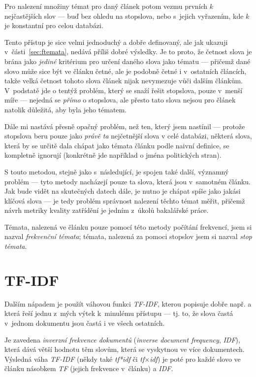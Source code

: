 \documentclass[12pt,a4paper]{report}
\begin{document}
Pro nalezení množiny témat pro daný článek potom vezmu prvních $k$ nej\-ča\-s\-tě\-j\-ších slov --- buď bez ohledu na stopslova, nebo s~jejich vyřazením, kde $k$ je konstantní pro celou databázi.

Tento přístup je sice velmi jednoduchý a dobře definovaný, ale jak ukazuji v~části~\ref{sec:ftemata}, nedává příliš dobré výsledky. Je to proto, že četnost slova je brána jako \emph{jediné} kritérium pro určení daného slova jako tématu --- přičemž dané slovo může sice být ve článku četné, ale je podobně četné i v~ostatních článcích, takže velká četnost tohoto slova článek nijak nevymezuje vůči dalším článkům. V~podstatě jde o tentýž problém, který se snaží řešit stopslova, pouze v~menší míře --- nejedná se \emph{přímo} o stopslova, ale přesto tato slova nejsou pro článek natolik důležitá, aby byla jeho tématem.

Dále mi nastává přesně opačný problém, než ten, který jsem nastínil --- protože stopslova beru pouze jako \emph{právě ta} nejčetnější slova v celé databázi, některá slova, která by se určitě dala chápat jako témata článku podle naivní definice, se kompletně ignorují (konkrétně jde například o jména politických stran).

S touto metodou, stejně jako s~následující, je spojen také další, významný problém --- tyto metody nacházejí pouze ta slova, která jsou v~samotném článku. Jak bude vidět na skutečných datech dále, je nutno je chápat spíše jako jakási klíčová slova --- je tedy problém správnost nalezení těchto témat měřit, přičemž návrh metriky kvality zatřídění je jedním z~úkolů bakalářské práce.

Témata, nalezená ve článku pouze pomocí této metody počítání frekvencí, jsem si nazval \emph{frekvenční témata}; témata, nalezená za pomoci stopslov jsem si nazval \emph{stop témata}.

\section{TF-IDF}
\label{sec:tfidf_teory}
Dalším nápadem je použít váhovou funkci \emph{TF-IDF}, kterou popisuje dobře např. \cite{approaches} a která řeší jednu z~mých výtek k~minulému přístupu --- tj. to, že slova častá v~jednom dokumentu jsou častá i ve všech ostatních.

Je zavedena \emph{inverzní frekvence dokumentů} (\emph{inverse document frequency}, \emph{IDF}), která dává větší hodnotu těm slovům, která se vyskytnou ve více dokumentech. Výsledná váha \emph{TF-IDF} (někdy také \emph{tf*idf} či \emph{tf$\times$idf}) je poté pro každé slovo ve článku násobkem \emph{TF} (jejich  frekvence v~článku) a \emph{IDF}.
\end{document}
